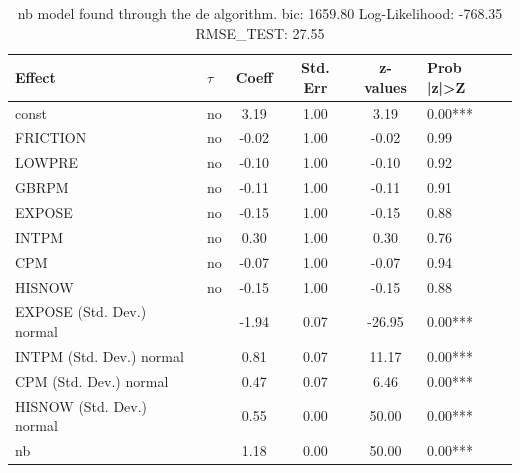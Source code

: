 \begin{table}
	\caption{nb model found through the de algorithm. bic: 1659.80 Log-Likelihood: -768.35 RMSE_TEST: 27.55}
	\begin{center}
		\begin{tabular}{|l|l|c|c|c|l|}
			\hline
			Effect & $\tau$ & Coeff & Std. Err & z-values & Prob |z|>Z \\
			\hline
			const & no & 3.19 & 1.00 & 3.19 & 0.00*** \\
			\hline
			FRICTION & no & -0.02 & 1.00 & -0.02 & 0.99 \\
			\hline
			LOWPRE & no & -0.10 & 1.00 & -0.10 & 0.92 \\
			\hline
			GBRPM & no & -0.11 & 1.00 & -0.11 & 0.91 \\
			\hline
			EXPOSE & no & -0.15 & 1.00 & -0.15 & 0.88 \\
			\hline
			INTPM & no & 0.30 & 1.00 & 0.30 & 0.76 \\
			\hline
			CPM & no & -0.07 & 1.00 & -0.07 & 0.94 \\
			\hline
			HISNOW & no & -0.15 & 1.00 & -0.15 & 0.88 \\
			\hline
			EXPOSE (Std. Dev.) normal &  & -1.94 & 0.07 & -26.95 & 0.00*** \\
			\hline
			INTPM (Std. Dev.) normal &  & 0.81 & 0.07 & 11.17 & 0.00*** \\
			\hline
			CPM (Std. Dev.) normal &  & 0.47 & 0.07 & 6.46 & 0.00*** \\
			\hline
			HISNOW (Std. Dev.) normal &  & 0.55 & 0.00 & 50.00 & 0.00*** \\
			\hline
			nb &  & 1.18 & 0.00 & 50.00 & 0.00*** \\
			\hline
		\end{tabular}
	\end{center}
\end{table}
